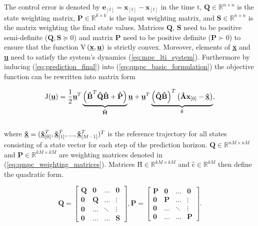 The control error is denoted by $\textbf{e}_{[t]} = \textbf{x}_{[t]} - \textbf{\~x}_{[t]}$ in the time t, $\textbf{Q} \in \mathbb{R}^{n\times n}$ is the state weighting matrix, $\textbf{P} \in \mathbb{R}^{k\times k}$ is the input weighting matrix, and $\textbf{S} \in \mathbb{R}^{n \times n}$ is the matrix weighting the final state values. Matrices $\textbf{Q}$, $\textbf{S}$ need to be positive semi-definite ($\textbf{Q}, \textbf{S} \succeq 0$) and matrix $\textbf{P}$ need to be positive definite ($\textbf{P} \succ 0$) to ensure that the function $\mathrm{V}\left(\textbf{\underline{x}}, \textbf{\underline{u}}\right)$ is strictly convex. Moreover, elements of \textbf{\underline{x}} and \textbf{\underline{u}} need to satisfy the system's dynamics (\ref{eq:mpc_lti_system}). Furthermore by inducing (\ref{eq:prediction_final}) into (\ref{eq:qmpc_basic_formulation}) the objective function can be rewritten into matrix form


\begin{equation}
\mathrm{J}(\underline{\textbf{u}}) = \frac{1}{2}\textbf{\underline{u}}^T\underbrace{\left(\textbf{\^B}^T\textbf{\^Q}\textbf{\^B} + \textbf{\^P}\right)}_{\textbf{\^H}}\textbf{\underline{u}} + \textbf{\underline{u}}^T\underbrace{\left(\textbf{\^Q}\textbf{\^B}\right)^T\left(\textbf{\^A}\textbf{x}_{[0]} - \textbf{\underline{\~x}}\right)}_{\textbf{\^c}},
\label{eq:mpc_objective_large}
\end{equation}
\\
where $\textbf{\underline{\~x}} = (\textbf{\underline{\~x}}_{[0]}^T, \textbf{\underline{\~x}}_{[1]}^T, ..., \textbf{\underline{\~x}}_{[M-1]}^T)^T$ is the reference trajectory for all states consisting of a state vector for each step of the prediction horizon. \mbox{$\textbf{\^Q} \in \mathbb{R}^{nM \times nM}$} and $\textbf{\^P} \in \mathbb{R}^{kM\times kM}$ are weighting matrices denoted in (\ref{eq:qmpc_weighting_matrices}). Matrices $\textbf{\^H} \in \mathbb{R}^{kM\times kM}$ and $\textbf{\^c} \in \mathbb{R}^{kM}$ then define the quadratic form. 

\begin{equation}
\label{eq:qmpc_weighting_matrices}
\textbf{\^Q} = \begin{bmatrix}
\textbf{Q} & \textbf{0} & \hdots & \textbf{0} \\
\textbf{0} & \textbf{Q} & \hdots & \vdots \\
\textbf{0} & \hdots & \ddots & \vdots \\
\textbf{0} & \hdots & \hdots & \textbf{S}
\end{bmatrix},
\textbf{\^P} = \begin{bmatrix}
\textbf{P} & \textbf{0} & \hdots & \textbf{0} \\
\textbf{0} & \textbf{P} & \hdots & \vdots \\
\textbf{0} & \hdots & \ddots & \vdots \\
\textbf{0} & \hdots & \hdots & \textbf{P}
\end{bmatrix}.
\end{equation}

